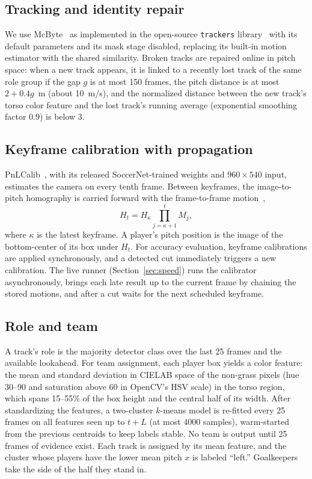 \documentclass[conference]{IEEEtran}
\begin{document}
\subsection{Tracking and identity repair}
We use McByte~\cite{stanczyk2025mcbyte} as implemented in the open-source \texttt{trackers} library~\cite{roboflowtrackers} with its default parameters and its mask stage disabled, replacing its built-in motion estimator with the shared similarity. Broken tracks are repaired online in pitch space: when a new track appears, it is linked to a recently lost track of the same role group if the gap $g$ is at most 150 frames, the pitch distance is at most $2+0.4g$~m (about 10~m/s), and the normalized distance between the new track's torso color feature and the lost track's running average (exponential smoothing factor 0.9) is below 3.

\subsection{Keyframe calibration with propagation}
PnLCalib~\cite{gutierrez2024pnlcalib}, with its released SoccerNet-trained weights and $960\times540$ input, estimates the camera on every tenth frame. Between keyframes, the image-to-pitch homography is carried forward with the frame-to-frame motion~\cite{hartley2003multiple},
\begin{equation}
H_t = H_\kappa \prod_{j=\kappa+1}^{t} M_j ,
\end{equation}
where $\kappa$ is the latest keyframe. A player's pitch position is the image of the bottom-center of its box under $H_t$. For accuracy evaluation, keyframe calibrations are applied synchronously, and a detected cut immediately triggers a new calibration. The live runner (Section~\ref{sec:speed}) runs the calibrator asynchronously, brings each late result up to the current frame by chaining the stored motions, and after a cut waits for the next scheduled keyframe.

\subsection{Role and team}
A track's role is the majority detector class over the last 25 frames and the available lookahead. For team assignment, each player box yields a color feature: the mean and standard deviation in CIELAB space of the non-grass pixels (hue 30--90 and saturation above 60 in OpenCV's HSV scale) in the torso region, which spans 15--55\% of the box height and the central half of its width. After standardizing the features, a two-cluster $k$-means model is re-fitted every 25 frames on all features seen up to $t+L$ (at most 4000 samples), warm-started from the previous centroids to keep labels stable. No team is output until 25 frames of evidence exist. Each track is assigned by its mean feature, and the cluster whose players have the lower mean pitch $x$ is labeled ``left.'' Goalkeepers take the side of the half they stand in.
\end{document}
